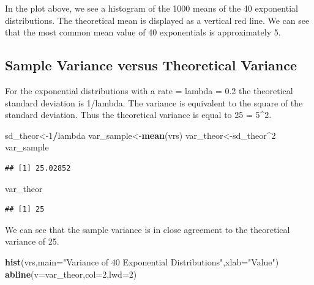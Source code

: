 \documentclass[
]{article}
\newenvironment{Shaded}{\begin{snugshade}}{\end{snugshade}}
\newcommand{\DataTypeTok}[1]{\textcolor[rgb]{0.13,0.29,0.53}{#1}}
\newcommand{\DecValTok}[1]{\textcolor[rgb]{0.00,0.00,0.81}{#1}}
\newcommand{\KeywordTok}[1]{\textcolor[rgb]{0.13,0.29,0.53}{\textbf{#1}}}
\newcommand{\NormalTok}[1]{#1}
\newcommand{\OperatorTok}[1]{\textcolor[rgb]{0.81,0.36,0.00}{\textbf{#1}}}
\newcommand{\StringTok}[1]{\textcolor[rgb]{0.31,0.60,0.02}{#1}}
\begin{document}
In the plot above, we see a histogram of the 1000 means of the 40
exponential distributions. The theoretical mean is displayed as a
vertical red line. We can see that the most common mean value of 40
exponentials is approximately 5.

\hypertarget{sample-variance-versus-theoretical-variance}{%
\subsection{Sample Variance versus Theoretical
Variance}\label{sample-variance-versus-theoretical-variance}}

For the exponential distributions with a rate = lambda = 0.2 the
theoretical standard deviation is 1/lambda. The variance is equivalent
to the square of the standard deviation. Thus the theoretical variance
is equal to 25 = 5\^{}2.

\begin{Shaded}
\begin{Highlighting}[]
\NormalTok{sd\_theor\textless{}{-}}\DecValTok{1}\OperatorTok{/}\NormalTok{lambda}
\NormalTok{var\_sample\textless{}{-}}\KeywordTok{mean}\NormalTok{(vrs)}
\NormalTok{var\_theor\textless{}{-}sd\_theor}\OperatorTok{\^{}}\DecValTok{2}
\NormalTok{var\_sample}
\end{Highlighting}
\end{Shaded}

\begin{verbatim}
## [1] 25.02852
\end{verbatim}

\begin{Shaded}
\begin{Highlighting}[]
\NormalTok{var\_theor}
\end{Highlighting}
\end{Shaded}

\begin{verbatim}
## [1] 25
\end{verbatim}

We can see that the sample variance is in close agreement to the
theoretical variance of 25.

\begin{Shaded}
\begin{Highlighting}[]
\KeywordTok{hist}\NormalTok{(vrs,}\DataTypeTok{main=}\StringTok{"Variance of 40 Exponential Distributions"}\NormalTok{,}\DataTypeTok{xlab=}\StringTok{"Value"}\NormalTok{)}
\KeywordTok{abline}\NormalTok{(}\DataTypeTok{v=}\NormalTok{var\_theor,}\DataTypeTok{col=}\DecValTok{2}\NormalTok{,}\DataTypeTok{lwd=}\DecValTok{2}\NormalTok{)}
\end{Highlighting}
\end{Shaded}
\end{document}
